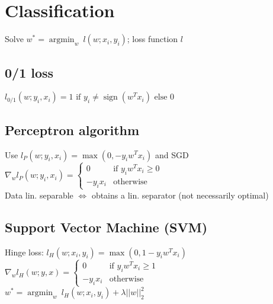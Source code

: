 \section*{Classification}

Solve $w^* = {\operatorname{argmin}_w} ~ l(w;x_i,y_i)$; loss function $l$

\subsection*{0/1 loss}
$l_{0/1} (w;y_i,x_i) = 1 \text{ if } y_i \neq \operatorname{sign}(w^Tx_i) \text{ else } 0$

\subsection*{Perceptron algorithm}
Use $l_P (w;y_i,x_i) = \operatorname{max}(0, -y_i w^T x_i)$ and SGD\\
$\nabla_w l_P(w;y_i,x_i) = 
\begin{cases}
    0 &\text{if } y_i w^T x_i \geq 0\\
    -y_i x_i &\text{otherwise}
\end{cases}$ \\
Data lin. separable $\Leftrightarrow$ obtains a lin. separator (not necessarily optimal)

\subsection*{Support Vector Machine (SVM)}
Hinge loss: $l_H(w;x_i,y_i) = \operatorname{max}(0,1-y_i w^T x_i)$ \\
$\nabla_w l_H(w;y,x) = 
\begin{cases}
    0 &\text{if } y_i w^T x_i \geq 1\\
    -y_i x_i &\text{otherwise}
\end{cases}$\\
$w^* = {\operatorname{argmin}_w} ~ l_H(w;x_i,y_i) + \lambda||w||_2^2$
